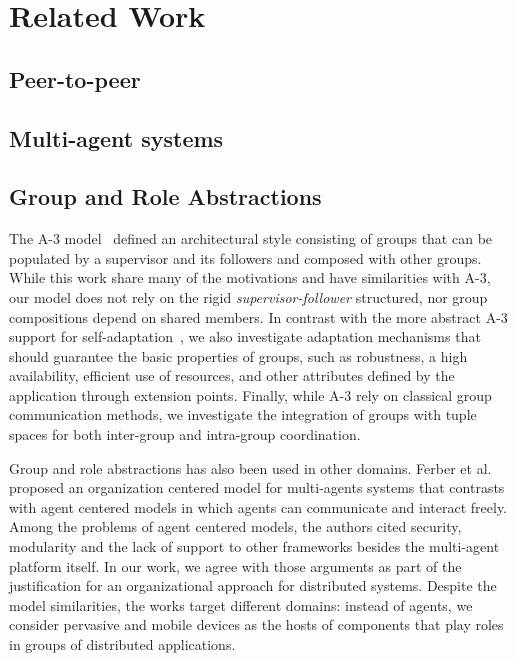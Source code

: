 \section{Related Work}\label{sec:related_work}



\subsection{Peer-to-peer}



\subsection{Multi-agent systems}



\subsection{Group and Role Abstractions}

The A-3 model~\cite{Baresi:2011:2} defined an architectural style consisting of groups that can be populated by a supervisor and its followers and composed with other groups. While this work share many of the motivations and have similarities with A-3, our model does not rely on the rigid \textit{supervisor-follower} structured, nor group compositions depend on shared members.
In contrast with the more abstract A-3 support for self-adaptation~\cite{Baresi:2011:2}, we also investigate adaptation mechanisms that should guarantee the basic properties of groups, such as robustness, a high availability, efficient use of resources, and other attributes defined by the application through extension points. Finally, while A-3 rely on classical group communication methods, we investigate the integration of groups with tuple spaces for both inter-group and intra-group coordination.

Group and role abstractions has also been used in other domains. Ferber et al.~\cite{Ferber:2004} proposed an organization centered model for multi-agents systems that contrasts with agent centered models in which agents can communicate and interact freely. Among the problems of agent centered models, the authors cited security, modularity and the lack of support to other frameworks besides the multi-agent platform itself. In our work, we agree with those arguments as part of the justification for an organizational approach for distributed systems. Despite the model similarities, the works target different domains: instead of agents, we consider pervasive and mobile devices as the hosts of components that play roles in groups of distributed applications. %

